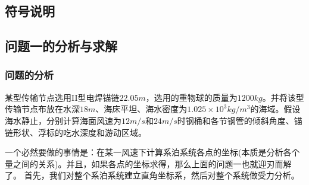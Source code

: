 \documentclass[UTF8]{ctexbook}
\theoremstyle{nonumberplain}
\begin{document}
    \subsection{符号说明}
    \subsection{问题一的分析与求解}
        \subsubsection{问题的分析}
            \par
            某型传输节点选用II型电焊锚链$22.05m$，选用的重物球的质量为$1200kg$。并将该型传输节点布放在水深$18m$、海床平坦、海水密度为$1.025\times 10^3kg/m^3$的海域。假设海水静止，分别计算海面风速为$12m/s$和$24m/s$时钢桶和各节钢管的倾斜角度、锚链形状、浮标的吃水深度和游动区域。
            \par
            一个必然要做的事情是：在某一风速下计算系泊系统各点的坐标(本质是分析各个量之间的关系)。并且，如果各点的坐标求得，那么上面的问题一也就迎刃而解了。
            首先，我们对整个系泊系统建立直角坐标系，然后对整个系统做受力分析。
\end{document}
